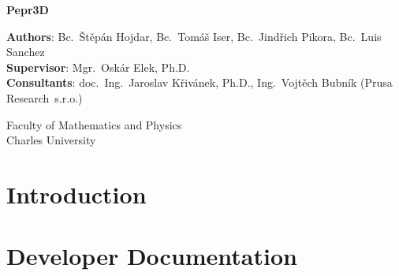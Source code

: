 \documentclass[12pt,a4paper]{report}
\begin{document}
\begin{titlepage}
    \begin{center}
        \vspace*{1cm}

        \Huge
        \textbf{Pepr3D}

        \LARGE

        \vspace{12cm}

		\Large
        \textbf{Authors}:
        Bc.~Štěpán Hojdar,
        Bc.~Tomáš Iser,
        Bc.~Jindřich Pikora,
		Bc.~Luis Sanchez
		\\
		\textbf{Supervisor}: Mgr.~Oskár Elek, Ph.D.
		\\
		\textbf{Consultants}: doc.~Ing.~Jaroslav Křivánek, Ph.D., Ing.~Vojtěch Bubník (Prusa Research~s.r.o.)

        \vfill

		Faculty of Mathematics and Physics \\
		Charles University
    \end{center}
\end{titlepage}

\setcounter{tocdepth}{1}
\tableofcontents

\part{Introduction}





\part{Developer Documentation}











\end{document}
